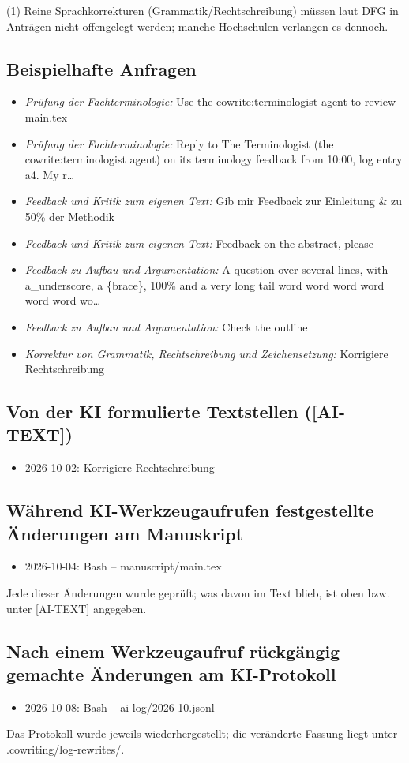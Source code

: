 \noindent(1) Reine Sprachkorrekturen (Grammatik/Rechtschreibung) müssen laut DFG in Anträgen nicht offengelegt werden; manche Hochschulen verlangen es dennoch.

\subsection*{Beispielhafte Anfragen}
\begin{itemize}
  \item \textit{Prüfung der Fachterminologie:} Use the cowrite:terminologist agent to review main.tex
  \item \textit{Prüfung der Fachterminologie:} Reply to The Terminologist (the cowrite:terminologist agent) on its terminology feedback from 10:00, log entry a4. My r…
  \item \textit{Feedback und Kritik zum eigenen Text:} Gib mir Feedback zur Einleitung \& zu 50\% der Methodik
  \item \textit{Feedback und Kritik zum eigenen Text:} Feedback on the abstract, please
  \item \textit{Feedback zu Aufbau und Argumentation:} A question over several lines, with a\_underscore, a \{brace\}, 100\% and a very long tail word word word word word word wo…
  \item \textit{Feedback zu Aufbau und Argumentation:} Check the outline
  \item \textit{Korrektur von Grammatik, Rechtschreibung und Zeichensetzung:} Korrigiere Rechtschreibung
\end{itemize}
\subsection*{Von der KI formulierte Textstellen ([AI-TEXT])}
\begin{itemize}
  \item 2026-10-02: Korrigiere Rechtschreibung
\end{itemize}
\subsection*{Während KI-Werkzeugaufrufen festgestellte Änderungen am Manuskript}
\begin{itemize}
  \item 2026-10-04: Bash – manuscript/main.tex
\end{itemize}
Jede dieser Änderungen wurde geprüft; was davon im Text blieb, ist oben bzw. unter [AI-TEXT] angegeben.
\subsection*{Nach einem Werkzeugaufruf rückgängig gemachte Änderungen am KI-Protokoll}
\begin{itemize}
  \item 2026-10-08: Bash – ai-log/2026-10.jsonl
\end{itemize}
Das Protokoll wurde jeweils wiederhergestellt; die veränderte Fassung liegt unter .cowriting/log-rewrites/.
